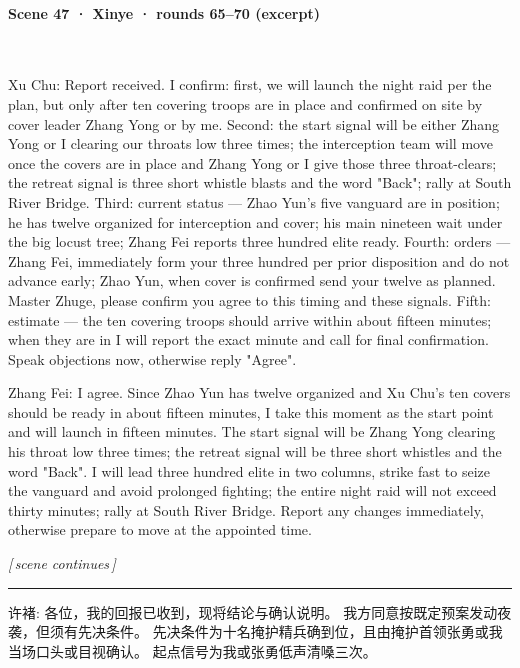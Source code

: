 \paragraph{Scene 47 · Xinye · rounds 65–70 (excerpt)}\mbox{}\\[2pt]
\begin{zhblock}\small\setlength{\parskip}{3pt}
Xu Chu:
Report received. I confirm: first, we will launch the night raid per the plan, but only after ten covering troops are in place and confirmed on site by cover leader Zhang Yong or by me.
Second: the start signal will be either Zhang Yong or I clearing our throats low three times; the interception team will move once the covers are in place and Zhang Yong or I give those three throat-clears; the retreat signal is three short whistle blasts and the word "Back"; rally at South River Bridge.
Third: current status — Zhao Yun's five vanguard are in position; he has twelve organized for interception and cover; his main nineteen wait under the big locust tree; Zhang Fei reports three hundred elite ready.
Fourth: orders — Zhang Fei, immediately form your three hundred per prior disposition and do not advance early; Zhao Yun, when cover is confirmed send your twelve as planned. Master Zhuge, please confirm you agree to this timing and these signals.
Fifth: estimate — the ten covering troops should arrive within about fifteen minutes; when they are in I will report the exact minute and call for final confirmation. Speak objections now, otherwise reply "Agree".
\par Zhang Fei:
I agree. Since Zhao Yun has twelve organized and Xu Chu's ten covers should be ready in about fifteen minutes, I take this moment as the start point and will launch in fifteen minutes.
The start signal will be Zhang Yong clearing his throat low three times; the retreat signal will be three short whistles and the word "Back".
I will lead three hundred elite in two columns, strike fast to seize the vanguard and avoid prolonged fighting; the entire night raid will not exceed thirty minutes; rally at South River Bridge.
Report any changes immediately, otherwise prepare to move at the appointed time.
\par\textit{[\,scene continues\,]}
\par\textcolor{gray}{\rule{0.3\textwidth}{0.4pt}}\par
{\color{gray} 许褚:
各位，我的回报已收到，现将结论与确认说明。
我方同意按既定预案发动夜袭，但须有先决条件。
先决条件为十名掩护精兵确到位，且由掩护首领张勇或我当场口头或目视确认。
起点信号为我或张勇低声清嗓三次。
}
\end{zhblock}
